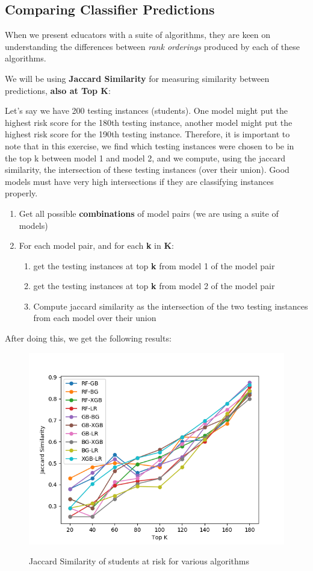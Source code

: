 \documentclass[11pt]{article}
\begin{document}
\subsection{Comparing Classifier Predictions}
When we present educators with a suite of algorithms, they are keen on understanding the differences between \textit{rank orderings} produced by each of these algorithms.

\noindent We will be using \textbf{Jaccard Similarity} for measuring similarity between predictions, \textbf{also at Top K}:

Let's say we have 200 testing instances (students). One model might put the highest risk score for the 180th testing instance, another model might put the highest risk score for the 190th testing instance. Therefore, it is important to note that in this exercise, we find which testing instances were chosen to be in the top k between model 1 and model 2, and we compute, using the jaccard similarity, the intersection of these testing instances (over their union). Good models must have very high intersections if they are classifying instances properly.

\begin{enumerate}
\item Get all possible \textbf{combinations} of model pairs (we are using a suite of models)
\item For each model pair, and for each \textbf{k} in \textbf{K}:
\begin{enumerate}
\item get the testing instances at top \textbf{k} from model 1 of the model pair
\item get the testing instances at top \textbf{k} from model 2 of the model pair
\item Compute jaccard similarity as the intersection of the two testing instances from each model over their union
\end{enumerate}
\end{enumerate}

After doing this, we get the following results:
\begin{figure}[H]
\centering
\includegraphics[scale=0.6]{plots/toydata/jaccardtopK.png}
\label{Fig:jaccardtopk}
\caption{Jaccard Similarity of students at risk for various algorithms}
\end{figure}
\end{document}
